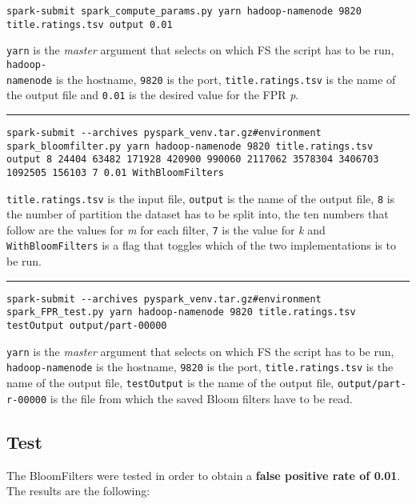 \begin{lstlisting}[basicstyle=\ttfamily\footnotesize, breaklines=true, backgroundcolor = \color{lightgray}]
spark-submit spark_compute_params.py yarn hadoop-namenode 9820 title.ratings.tsv output 0.01
\end{lstlisting}
\hfill \break
\texttt{yarn} is the \textit{master} argument that selects on which FS the script has to be run, \texttt{hadoop-\\namenode} is the hostname, \texttt{9820} is the port, \texttt{title.ratings.tsv} is the name of the output file and \texttt{0.01} is the desired value for the FPR \textit{p}.
\vspace{5pt}
\hrule
\vspace{6pt}
\begin{lstlisting}[basicstyle=\ttfamily\footnotesize,breaklines=true, backgroundcolor = \color{lightgray}]
spark-submit --archives pyspark_venv.tar.gz#environment spark_bloomfilter.py yarn hadoop-namenode 9820 title.ratings.tsv output 8 24404 63482 171928 420900 990060 2117062 3578304 3406703 1092505 156103 7 0.01 WithBloomFilters
\end{lstlisting}
\hfill \break
\texttt{title.ratings.tsv} is the input file, \texttt{output} is the name of the output file, \texttt{8} is the number of partition the dataset has to be split into, the ten numbers that follow are the values for \textit{m} for each filter, \texttt{7} is the value for \textit{k} and \texttt{WithBloomFilters} is a flag that toggles which of the two implementations is to be run.
\vspace{5pt}
\hrule
\vspace{6pt}
\begin{lstlisting}[basicstyle=\ttfamily\footnotesize, breaklines=true, backgroundcolor = \color{lightgray}]
spark-submit --archives pyspark_venv.tar.gz#environment spark_FPR_test.py yarn hadoop-namenode 9820 title.ratings.tsv testOutput output/part-00000
\end{lstlisting}
\hfill \break
\texttt{yarn} is the \textit{master } argument that selects on which FS the script has to be run, \texttt{hadoop-namenode} is the hostname, \texttt{9820} is the port, \texttt{title.ratings.tsv} is the name of the output file, \texttt{testOutput} is the name of the output file, \texttt{output/part-r-00000} is the file from which the saved Bloom filters have to be read.

\subsection{Test}\label{sub:testSpark}
The BloomFilters were tested in order to obtain a \textbf{false positive rate of 0.01}. The results are the following:\\

